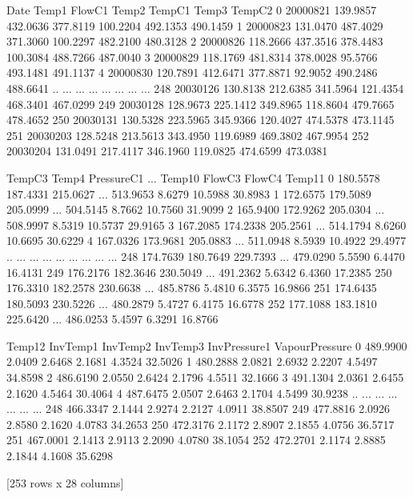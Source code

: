\documentclass[letterpaper,10pt,english]{jupyterBook}
\begin{document}
\begin{sphinxVerbatim}[commandchars=\\\{\}]
           Date     Temp1    FlowC1     Temp2    TempC1     Temp3    TempC2  \PYGZbs{}
0    2000\PYGZhy{}08\PYGZhy{}21  139.9857  432.0636  377.8119  100.2204  492.1353  490.1459   
1    2000\PYGZhy{}08\PYGZhy{}23  131.0470  487.4029  371.3060  100.2297  482.2100  480.3128   
2    2000\PYGZhy{}08\PYGZhy{}26  118.2666  437.3516  378.4483  100.3084  488.7266  487.0040   
3    2000\PYGZhy{}08\PYGZhy{}29  118.1769  481.8314  378.0028   95.5766  493.1481  491.1137   
4    2000\PYGZhy{}08\PYGZhy{}30  120.7891  412.6471  377.8871   92.9052  490.2486  488.6641   
..          ...       ...       ...       ...       ...       ...       ...   
248  2003\PYGZhy{}01\PYGZhy{}26  130.8138  212.6385  341.5964  121.4354  468.3401  467.0299   
249  2003\PYGZhy{}01\PYGZhy{}28  128.9673  225.1412  349.8965  118.8604  479.7665  478.4652   
250  2003\PYGZhy{}01\PYGZhy{}31  130.5328  223.5965  345.9366  120.4027  474.5378  473.1145   
251  2003\PYGZhy{}02\PYGZhy{}03  128.5248  213.5613  343.4950  119.6989  469.3802  467.9954   
252  2003\PYGZhy{}02\PYGZhy{}04  131.0491  217.4117  346.1960  119.0825  474.6599  473.0381   

       TempC3     Temp4  PressureC1  ...    Temp10  FlowC3   FlowC4   Temp11  \PYGZbs{}
0    180.5578  187.4331    215.0627  ...  513.9653  8.6279  10.5988  30.8983   
1    172.6575  179.5089    205.0999  ...  504.5145  8.7662  10.7560  31.9099   
2    165.9400  172.9262    205.0304  ...  508.9997  8.5319  10.5737  29.9165   
3    167.2085  174.2338    205.2561  ...  514.1794  8.6260  10.6695  30.6229   
4    167.0326  173.9681    205.0883  ...  511.0948  8.5939  10.4922  29.4977   
..        ...       ...         ...  ...       ...     ...      ...      ...   
248  174.7639  180.7649    229.7393  ...  479.0290  5.5590   6.4470  16.4131   
249  176.2176  182.3646    230.5049  ...  491.2362  5.6342   6.4360  17.2385   
250  176.3310  182.2578    230.6638  ...  485.8786  5.4810   6.3575  16.9866   
251  174.6435  180.5093    230.5226  ...  480.2879  5.4727   6.4175  16.6778   
252  177.1088  183.1810    225.6420  ...  486.0253  5.4597   6.3291  16.8766   

       Temp12  InvTemp1  InvTemp2  InvTemp3  InvPressure1  VapourPressure  
0    489.9900    2.0409    2.6468    2.1681        4.3524         32.5026  
1    480.2888    2.0821    2.6932    2.2207        4.5497         34.8598  
2    486.6190    2.0550    2.6424    2.1796        4.5511         32.1666  
3    491.1304    2.0361    2.6455    2.1620        4.5464         30.4064  
4    487.6475    2.0507    2.6463    2.1704        4.5499         30.9238  
..        ...       ...       ...       ...           ...             ...  
248  466.3347    2.1444    2.9274    2.2127        4.0911         38.8507  
249  477.8816    2.0926    2.8580    2.1620        4.0783         34.2653  
250  472.3176    2.1172    2.8907    2.1855        4.0756         36.5717  
251  467.0001    2.1413    2.9113    2.2090        4.0780         38.1054  
252  472.2701    2.1174    2.8885    2.1844        4.1608         35.6298  

[253 rows x 28 columns]
\end{sphinxVerbatim}
\end{document}
